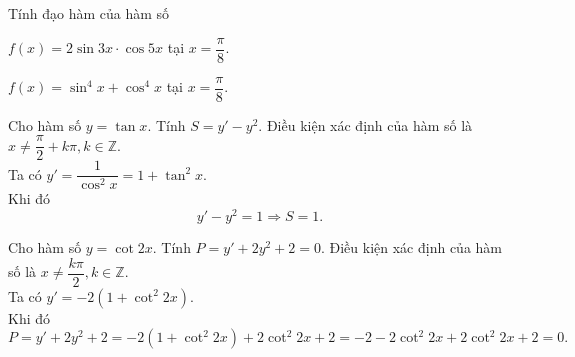 \begin{bt}%
Tính đạo hàm của hàm số
\begin{listEX}[1]
\item $f(x)=2\sin 3x\cdot\cos 5x$ tại $x=\dfrac{\pi}{8}$.
\item $f(x)=\sin^4x+\cos^4x$ tại $x=\dfrac{\pi}{8}$.
\end{listEX}
\end{bt}

\begin{bt}%
	Cho hàm số $y=\tan x$. Tính $S=y'-y^2$.
	\loigiai
	{
		Điều kiện xác định của hàm số là $x\neq \dfrac{\pi}{2}+k\pi, k\in \mathbb{Z}$.\\
		Ta có $y'=\dfrac{1}{\cos^2 x}=1+\tan^2 x$.\\
		Khi đó
		\[y'-y^2 = 1\Rightarrow S=1.\]
			}
\end{bt}

\begin{bt}%
Cho hàm số $y=\cot 2x$. Tính $P=y'+2y^2+2=0$.
	\loigiai
	{
		Điều kiện xác định của hàm số là $x\neq \dfrac{k\pi}{2}, k\in \mathbb{Z}$.\\
		Ta có $y'=-2\left(1+\cot^2 2x\right)$.\\
		Khi đó
		\[P=y'+2y^2+2 = -2\left(1+\cot^2 2x\right)+2\cot^2 2x+2 = -2-2\cot^2 2x+2\cot^2 2x+2 = 0.\]
			}
\end{bt}


